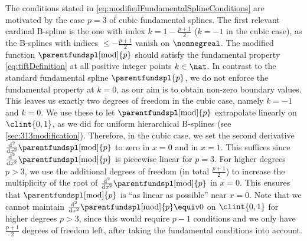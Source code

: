 The conditions stated in \eqref{eq:modifiedFundamentalSplineConditions}
are motivated by the case $p = 3$ of cubic fundamental splines.
The first relevant cardinal B-spline is the one with
index $k = 1 - \tfrac{p+1}{2}$ ($k = -1$ in the cubic case),
as the B-splines with indices $\le -\tfrac{p+1}{2}$ vanish on $\nonnegreal$.
The modified function $\parentfundspl[\modified]{p}$
should satisfy the fundamental property \eqref{eq:tiftDefinition}
at all positive integer points $k \in \nat$.
In contrast to the standard fundamental spline $\parentfundspl{p}$,
we do not enforce the fundamental property at $k = 0$,
as our aim is to obtain non-zero boundary values.
This leaves us exactly two degrees of freedom in the cubic case,
namely $k = -1$ and $k = 0$.
We use these to let $\parentfundspl[\modified]{p}$ extrapolate
linearly on $\clint{0, 1}$, as we did for uniform hierarchical
B-splines (see \cref{sec:313modification}).
Therefore, in the cubic case, we set the second derivative
$\tfrac{\diff^2}{\dx^2} \parentfundspl[\modified]{p}$ to zero
in $x = 0$ and in $x = 1$.
This suffices since
$\tfrac{\diff^2}{\dx^2} \parentfundspl[\modified]{p}$ is piecewise
linear for $p = 3$.
For higher degrees $p > 3$,
we use the additional degrees of freedom (in total $\tfrac{p+1}{2}$)
to increase the multiplicity of the root of
$\tfrac{\diff^2}{\dx^2} \parentfundspl[\modified]{p}$ in $x = 0$.
This ensures that $\parentfundspl[\modified]{p}$ is
``as linear as possible'' near $x = 0$.
Note that we cannot maintain
$\tfrac{\diff^2}{\dx^2} \parentfundspl[\modified]{p} \equiv 0$
on $\clint{0, 1}$ for higher degrees $p > 3$,
since this would require $p - 1$ conditions
and we only have $\tfrac{p+1}{2}$ degrees of freedom left,
after taking the fundamental conditions into account.
